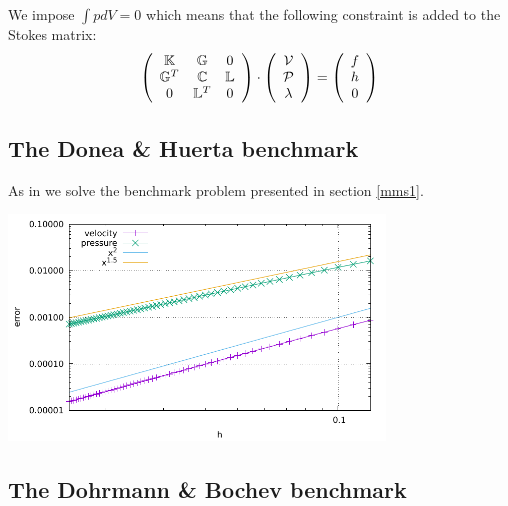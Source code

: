 






We impose $\int p dV=0$ which means that the following constraint is added 
to the Stokes matrix:
\[
\left(
\begin{array}{ccc}
{\mathbb{K}} & {\mathbb{G}} & 0\\ 
{\mathbb{G}}^T & {\mathbb{C}} & {\mathbb{L}} \\
0 & {\mathbb{L}}^T & 0 
\end{array}
\right)
\cdot
\left(
\begin{array}{c}
{\cal V} \\ {\cal P} \\ \lambda
\end{array}
\right)
=
\left(
\begin{array}{c}
 f \\ h \\ 0
\end{array}
\right)
\]











\subsection*{The Donea \& Huerta benchmark}

As in \cite{dohu03} we solve the benchmark problem presented in section \ref{mms1}.

\includegraphics[width=10cm]{python_codes/fieldstone_22/results/case1/errors.pdf}

\subsection*{The Dohrmann \& Bochev benchmark} 

